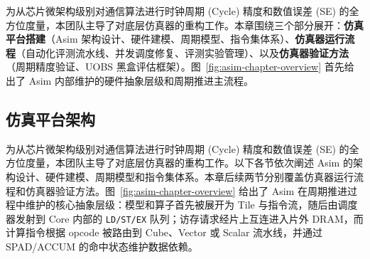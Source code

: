 \documentclass{CjC}
\begin{document}
    为从芯片微架构级别对通信算法进行时钟周期 (Cycle) 精度和数值误差 (SE)
    的全方位度量，本团队主导了对底层仿真器的重构工作。本章围绕三个部分展开：\textbf{仿真平台搭建}（Asim
    架构设计、硬件建模、周期模型、指令集体系）、\textbf{仿真器运行流程}（自动化评测流水线、并发调度修复、评测实验管理）、以及\textbf{仿真器验证方法}（周期精度验证、UOBS
    黑盒评估框架）。图~\ref{fig:asim-chapter-overview} 首先给出了 Asim 内部维护的硬件抽象层级和周期推进主流程。

    \subsection{仿真平台架构}

    为从芯片微架构级别对通信算法进行时钟周期 (Cycle) 精度和数值误差 (SE) 的全方位度量，本团队主导了对底层仿真器的重构工作。以下各节依次阐述
    Asim 的架构设计、硬件建模、周期模型和指令集体系。本章后续两节分别覆盖仿真器运行流程和仿真器验证方法。图~\ref{fig:asim-chapter-overview}
    给出了 Asim 在周期推进过程中维护的核心抽象层级：模型和算子首先被展开为 Tile 与指令流，随后由调度器发射到 Core 内部的
    \texttt{LD/ST/EX} 队列；访存请求经片上互连进入片外 DRAM，而计算指令根据 opcode 被路由到 Cube、Vector 或 Scalar
    流水线，并通过 SPAD/ACCUM 的命中状态维护数据依赖。
\end{document}
